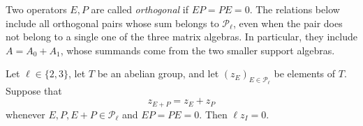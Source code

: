 Two operators $E,P$ are called \emph{orthogonal} if $EP=PE=0$.
The relations below include all orthogonal pairs whose sum belongs to
$\mathcal P_\ell$, even when the pair does not belong to a single one of
the three matrix algebras.  In particular, they include
$A=A_0+A_1$, whose summands come from the two smaller support algebras.

\begin{lemma}\label{lem:idempotents}
Let $\ell\in\{2,3\}$, let $T$ be an abelian group, and let
$(z_E)_{E\in\mathcal P_\ell}$ be elements of $T$.  Suppose that
\begin{equation}\label{eq:idempotent-additivity}
 z_{E+P}=z_E+z_P
\end{equation}
whenever $E,P,E+P\in\mathcal P_\ell$ and $EP=PE=0$.
Then $\ell z_I=0$.
\end{lemma}

